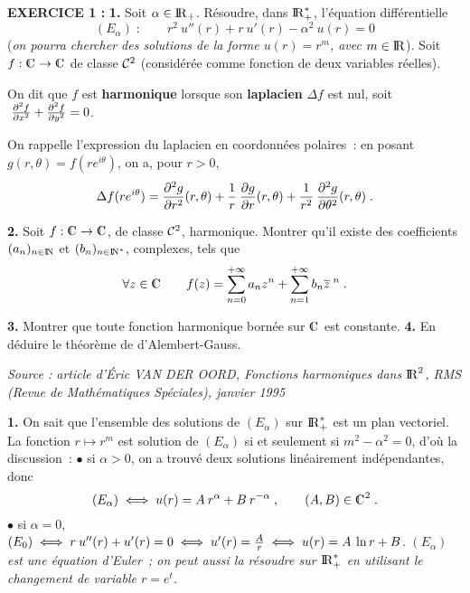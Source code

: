 \documentclass{article}
\begin{document}
{\bf EXERCICE 1 :}\msk
{\bf 1.} Soit $\alpha\in{\rm I\kern-0.6mm R}_+$. R\'esoudre, dans ${\rm I\kern-0.6mm R}_+^*$, l'\'equation diff\'erentielle\vv
$$(E_{\alpha})\;:\qquad r^2\>u''(r)+r\>u'(r)-\alpha^2\>u(r)=0$$
({\it on pourra chercher des solutions de la forme $u(r)=r^m$, avec $m\in{\rm I\kern-0.6mm R}$}).\msk
Soit $f:\cmat\vers\cmat$ de classe ${\cal C}^2$ (consid\'er\'ee comme fonction de deux variables r\'eelles).\par On dit que $f$ est {\bf harmonique} lorsque son {\bf laplacien} $\Delta f$ est nul, soit $\;{\partial^2 f\over\partial x^2}+{\partial^2f\over\partial y^2}=0$.\par On rappelle l'expression du laplacien en coordonn\'ees polaires~: en posant $g(r,\theta)=f(re^{i\theta})$, on a, pour $r>0$,\vvv
$$\Delta f(re^{i\theta})={\partial^2g\over\partial r^2}(r,\theta)+{1\over r}\>{\partial g\over\partial r}(r,\theta)+{1\over r^2}\>{\partial^2g\over\partial\theta^2}(r,\theta)\;.$$\par
{\bf 2.} Soit $f:\cmat\vers\cmat$, de classe ${\cal C}^2$, harmonique. Montrer qu'il existe des coefficients $(a_n)_{n\in{\rm I\kern-0.5mm N}}$ et $(b_n)_{n\in{\rm I\kern-0.5mm N}^*}$, complexes, tels que\vvv
$$\a z\in\cmat\qquad f(z)=\sum_{n=0}^{\ii}a_nz^n+\sum_{n=1}^{\ii}b_n\ov{z}^{\;n}\;.$$\par
{\bf 3.} Montrer que toute fonction harmonique born\'ee sur $\cmat$ est constante.\msk
{\bf 4.} En d\'eduire le th\'eor\`eme de d'Alembert-Gauss.

\msk
{\it Source : article d'\'Eric VAN DER OORD, Fonctions harmoniques dans ${\rm I\kern-0.6mm R}^2$, RMS (Revue de Math\'ematiques Sp\'eciales), janvier 1995}\msk 


\msk
\cl{- - - - - - - - - - - - - - - - - - - - - - - - - - - - - - - }
\msk

{\bf 1.} On sait que l'ensemble des solutions de $(E_{\alpha})$ sur ${\rm I\kern-0.6mm R}_+^*$ est un plan vectoriel. 
La fonction $r\mapsto r^m$ est solution de $(E_{\alpha})$ si et seulement si $m^2-\alpha^2=0$, d'o\`u la discussion~:\ssk\new
$\bullet$ si $\alpha>0$, on a trouv\'e deux solutions lin\'eairement ind\'ependantes, donc\vv
$$(E_{\alpha})\iff u(r)=A\>r^{\alpha}+B\>r^{-\alpha}\;,\qquad (A,B)\in\cmat^2\;.$$
$\bullet$ si $\alpha=0$, $(E_0)\iff r\>u''(r)+u'(r)=0\iff u'(r)={A\over r}\iff u(r)=A\>\ln r+B$.
\msk\sect
{\it $(E_{\alpha})$ est une \'equation d'Euler~; on peut aussi la r\'esoudre sur ${\rm I\kern-0.6mm R}_+^*$ en utilisant le changement de variable $r=e^t$.}
\end{document}
